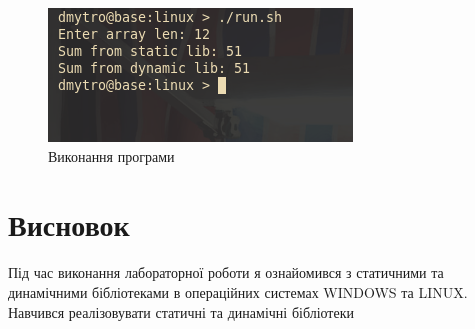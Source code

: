 \documentclass{article}
\begin{document}
\begin{normalsize}
		\begin{figure}[H]
		\centering
		\includegraphics[scale=0.9]{2}
		\caption{Виконання програми}
	\end{figure}
	
	\section*{Висновок}
	Під час виконання лабораторної роботи я ознайомився з статичними та динамічними бібліотеками в операційних
	системах WINDOWS та LINUX. Навчився реалізовувати статичні та динамічні
	бібліотеки
	
	 
\end{normalsize}
\end{document}
